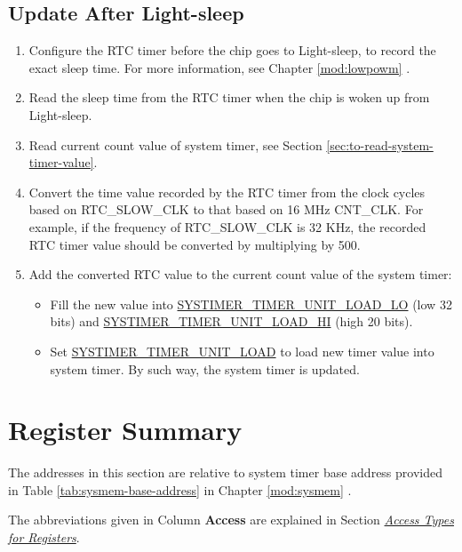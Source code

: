 \documentclass[main\_\_EN.tex]{subfiles}
\begin{document}
\subsection{Update After Light-sleep}
\begin{enumerate}
    \item Configure the RTC timer before the chip goes to Light-sleep, to record the exact sleep time. For more information, see Chapter \ref{mod:lowpowm} \textit{}.
    \item Read the sleep time from the RTC timer when the chip is woken up from Light-sleep.
    \item Read current count value of system timer, see Section \ref{sec:to-read-system-timer-value}.
    \item Convert the time value recorded by the RTC timer from the clock cycles based on RTC\_SLOW\_CLK to that based on 16 MHz CNT\_CLK. For example, if the frequency of RTC\_SLOW\_CLK is 32 KHz, the recorded RTC timer value should be converted by multiplying by 500.
    \item Add the converted RTC value to the current count value of the system timer:
    \begin{itemize}
        \item Fill the new value into \hyperref[fielddesc:SYSTIMERTIMERUNIT0LOADLO]{SYSTIMER\_TIMER\_UNIT\_LOAD\_LO} (low 32 bits) and \hyperref[fielddesc:SYSTIMERTIMERUNIT0LOADHI]{SYSTIMER\_TIMER\_UNIT\_LOAD\_HI} (high 20 bits).
        \item Set \hyperref[fielddesc:SYSTIMERTIMERUNIT0LOAD]{SYSTIMER\_TIMER\_UNIT\_LOAD} to load new timer value into system timer. By such way, the system timer is updated.    \end{itemize}
\end{enumerate}



\hypertarget{systimer-summ}{}
\section{Register Summary}
\label{sec:28-systimer-reg-summ}

The addresses in this section are relative to system timer base address provided in Table \ref{tab:sysmem-base-address} in Chapter \ref{mod:sysmem} \textit{}.

The abbreviations given in Column \textbf{Access} are explained in Section \hyperref[glossary-access-types]{\textit{Access Types for Registers}}.
\end{document}
